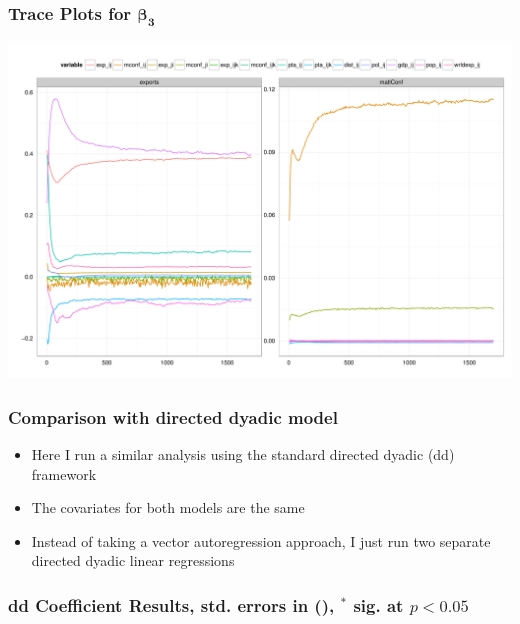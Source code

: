 \documentclass[10pt, compress]{beamer}
\begin{document}
\frame
{
\frametitle{Trace Plots for $\boldsymbol{\beta_{3}}$}
  \centering
  \includegraphics[width=1\textwidth]{trace.pdf}
}

\frame
{
  \frametitle{Comparison with directed dyadic model}
  \begin{itemize}
  \item Here I run a similar analysis using the standard directed dyadic (dd) framework
  \item The covariates for both models are the same 
  \item Instead of taking a vector autoregression approach, I just run two separate directed dyadic linear regressions
  \end{itemize}
} 

\frame
{
  \frametitle{dd Coefficient Results, std. errors in (), $^*$ sig. at $p< 0.05 $ }
  \vspace{-.3in}
  \tiny{}
}
\end{document}
